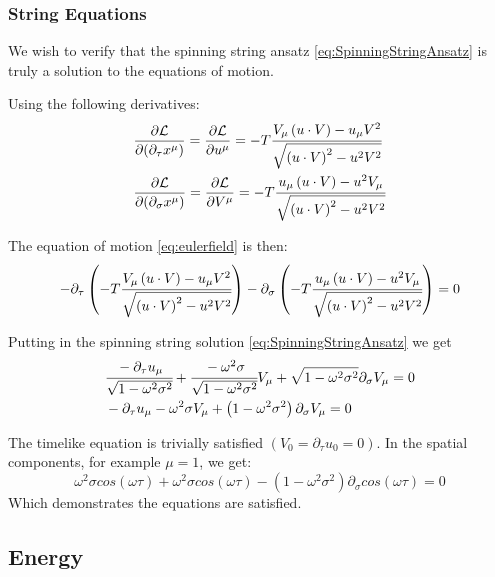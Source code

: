 \documentclass[11pt,a4paper]{article}
\begin{document}
\FloatBarrier
\subsubsection{String Equations}
 
We wish to verify that the spinning string ansatz \ref{eq:SpinningStringAnsatz} is truly a solution to the equations of motion.

Using the following derivatives:
\begin{align*}
&\frac{\partial\mathcal{L}}{\partial(\partial_{\tau}x^{\mu})}=\frac{\partial\mathcal{L}}{\partial u^{\mu}}=-T\cfrac{V_{\mu}\left(u\cdot V\right)-u_{\mu}V^{2}}{\sqrt{\left(u\cdot V\right)^{2}-u^{2}V^{2}}}\\
&\frac{\partial\mathcal{L}}{\partial(\partial_{\sigma}x^{\mu})}=\frac{\partial\mathcal{L}}{\partial V^{\mu}}=-T\cfrac{u_{\mu}\left(u\cdot V\right)-u^{2}V_{\mu}}{\sqrt{\left(u\cdot V\right)^{2}-u^{2}V^{2}}}
\end{align*} 

The equation of motion \ref{eq:eulerfield} is then:
\begin{equation*}
-\partial_{\tau}\left(-T\cfrac{V_{\mu}\left(u\cdot V\right)-u_{\mu}V^{2}}{\sqrt{\left(u\cdot V\right)^{2}-u^{2}V^{2}}}\right)-\partial_{\sigma}\left(-T\cfrac{u_{\mu}\left(u\cdot V\right)-u^{2}V_{\mu}}{\sqrt{\left(u\cdot V\right)^{2}-u^{2}V^{2}}}\right)=0
\end{equation*}

Putting in the spinning string solution \ref{eq:SpinningStringAnsatz} we get
\begin{align*}
&\cfrac{-\partial_{\tau}u_{\mu}}{\sqrt{1-\omega^{2}\sigma^{2}}}+\cfrac{-\omega^{2}\sigma}{\sqrt{1-\omega^{2}\sigma^{2}}}V_{\mu}+\sqrt{1-\omega^{2}\sigma^{2}}\partial_{\sigma}V_{\mu}=0\\
&-\partial_{\tau}u_{\mu}-\omega^{2}\sigma V_{\mu}+\left(1-\omega^{2}\sigma^{2}\right)\partial_{\sigma}V_{\mu}=0
\end{align*} 

The timelike equation is trivially satisfied $\left(V_{0}=\partial_{\tau}u_{0}=0\right)$. In the spatial components, for example $\mu=1$, we get:
\begin{equation*}
\omega^{2}\sigma cos\left(\omega\tau\right)
+\omega^{2}\sigma cos\left(\omega\tau\right)
-\left(1-\omega^{2}\sigma^{2}\right)\partial_{\sigma}cos\left(\omega\tau\right)=0
\end{equation*}
Which demonstrates the equations are satisfied.
\FloatBarrier
 \subsection{Energy}
 
\end{document}
